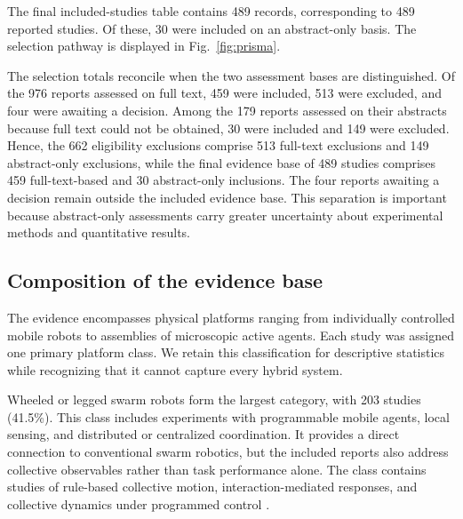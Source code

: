 The final included-studies table contains 489 records, corresponding to 489 reported studies. Of these, 30 were included on an abstract-only basis. The selection pathway is displayed in Fig.~\ref{fig:prisma}.

The selection totals reconcile when the two assessment bases are distinguished. Of the 976 reports assessed on full text, 459 were included, 513 were excluded, and four were awaiting a decision. Among the 179 reports assessed on their abstracts because full text could not be obtained, 30 were included and 149 were excluded. Hence, the 662 eligibility exclusions comprise 513 full-text exclusions and 149 abstract-only exclusions, while the final evidence base of 489 studies comprises 459 full-text-based and 30 abstract-only inclusions. The four reports awaiting a decision remain outside the included evidence base. This separation is important because abstract-only assessments carry greater uncertainty about experimental methods and quantitative results.

\subsection{Composition of the evidence base}
\label{sec:results-composition}

The evidence encompasses physical platforms ranging from individually controlled mobile robots to assemblies of microscopic active agents. Each study was assigned one primary platform class. We retain this classification for descriptive statistics while recognizing that it cannot capture every hybrid system.

Wheeled or legged swarm robots form the largest category, with 203 studies (41.5\%). This class includes experiments with programmable mobile agents, local sensing, and distributed or centralized coordination. It provides a direct connection to conventional swarm robotics, but the included reports also address collective observables rather than task performance alone. The class contains studies of rule-based collective motion, interaction-mediated responses, and collective dynamics under programmed control \cite{Miki2010asimplerulebased,Yamada2011circularmotiongene,Chen2013aflockingalgorithm,Wang2021fielddriverobotsw,Fruchart2022nonreciprocalphase,Yang2023collectivechaseem,Paramanick2024emergenceofrunand,Kernbach2011threecasesofconne,Giardina2022collectivephototact,Vega2023simulatelessexpec,Vega2023indirectswarmcontr}.

